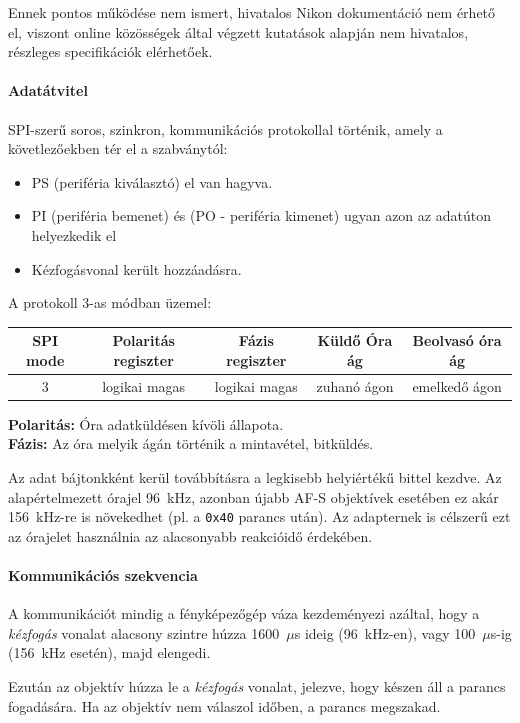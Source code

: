 Ennek pontos működése nem ismert, hivatalos Nikon dokumentáció nem érhető el, viszont online közösségek által végzett kutatások alapján nem hivatalos, részleges specifikációk elérhetőek.
\paragraph{Adatátvitel}
SPI-szerű soros, szinkron, kommunikációs protokollal történik, amely a követlezőekben tér el a szabványtól:
\begin{itemize}
    \item PS (periféria kiválasztó) el van hagyva.
    \item PI (periféria bemenet) és (PO - periféria kimenet) ugyan azon az adatúton helyezkedik el
    \item Kézfogásvonal került hozzáadásra.
\end{itemize}

A protokoll 3-as módban üzemel:
\begin{table}[H]
    \centering
    \begin{tabular}{|c|c|c|c|c|}
        \hline
        \rowcolor{lightgray} SPI mode & Polaritás regiszter & Fázis regiszter & Küldő Óra ág & Beolvasó óra ág \\
        \hline
        3 & logikai magas & logikai magas & zuhanó ágon & emelkedő ágon \\
        \hline
    \end{tabular}
\end{table} \textbf{Polaritás:} Óra adatküldésen kívöli állapota.\\
\textbf{Fázis:} Az óra melyik ágán történik a mintavétel, bitküldés.

Az adat bájtonkként kerül továbbításra a legkisebb helyiértékű bittel kezdve.
Az alapértelmezett órajel 96~kHz, azonban újabb AF-S objektívek esetében ez akár 156~kHz-re is növekedhet (pl. a \texttt{0x40} parancs után).
Az adapternek is célszerű ezt az órajelet használnia az alacsonyabb reakcióidő érdekében.

\paragraph{Kommunikációs szekvencia}

A kommunikációt mindig a fényképezőgép váza kezdeményezi azáltal, hogy 
a \textit{kézfogás} vonalat alacsony szintre húzza 1600~$\mu$s ideig 
(96~kHz-en), vagy 100~$\mu$s-ig (156~kHz esetén), majd elengedi. 

Ezután az objektív húzza le a \textit{kézfogás} vonalat, jelezve, hogy készen 
áll a parancs fogadására. Ha az objektív nem válaszol időben, a parancs 
megszakad.

